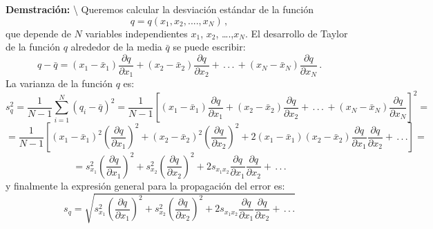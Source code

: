 \documentclass[
]{agujournal2019}
\begin{document}
\noindent \textbf {Demstración:} \textbackslash{} \noindent Queremos
calcular la desviación estándar de la función
\[q=q(x_1, x_2,....,x_N)\,,\] que depende de \(N\) variables
independientes \(x_1\), \(x_2\), \ldots.,\(x_N\). El desarrollo de
Taylor de la función \(q\) alrededor de la media \(\bar{q}\) se puede
escribir:
\[q - \bar{q}=\left(x_1 - \bar{x}_1\right)\frac{\partial{q}}{\partial{x_1}} +
                          \left(x_2 - \bar{x}_2\right)\frac{\partial{q}}{\partial{x_2}}+  \,.\,.\,.\,
                          + \left(x_N - \bar{x}_N\right)\frac{\partial{q}}{\partial{x_N}}\,.\]
La varianza de la función \(q\) es:
\[s^2_q=\frac{1}{N-1}\sum\limits^N_{i=1}\left( q_i-\bar{q} \right)^2=
               \frac{1}{N-1}\left[
               \left(x_1 - \bar{x}_1\right)\frac{\partial{q}}{\partial{x_1}} +
               \left(x_2 - \bar{x}_2\right)\frac{\partial{q}}{\partial{x_2}} +
              \,.\,.\,.\, +
               \left(x_N - \bar{x}_N\right)\frac{\partial{q}}{\partial{x_N}}
               \right]^2=\] \[=\frac{1}{N-1}\left[
\left(x_1 - \bar{x}_1\right)^2\left(\frac{\partial{q}}{\partial{x_1}}\right)^2 +
\left(x_2 - \bar{x}_2\right)^2\left(\frac{\partial{q}}{\partial{x_2}}\right)^2 +
2\left(x_1 - \bar{x}_1\right)\left(x_2 - \bar{x}_2\right)
\frac{\partial{q}}{\partial{x_1}}\frac{\partial{q}}{\partial{x_2}}+\,.\,.\,.
\right]=\]
\[=s^2_{x_1}\left(\frac{\partial{q}}{\partial{x_1}}\right)^2 +
   s^2_{x_2}\left(\frac{\partial{q}}{\partial{x_2}}\right)^2+
   2 s_{{x_1}{x_2}}
   \frac{\partial{q}}{\partial{x_1}}\frac{\partial{q}}{\partial{x_2}}+\,.\,.\,.\]
y finalmente la expresión general para la propagación del error es:
\[s_{q}=\sqrt{s^2_{x_1}\left(\frac{\partial{q}}{\partial{x_1}}\right)^2 +
               s^2_{x_2}\left(\frac{\partial{q}}{\partial{x_2}}\right)^2+
                2 s_{{x_1}{x_2}}
                \frac{\partial{q}}{\partial{x_1}}\frac{\partial{q}}{\partial{x_2}}+\,.\,.\,.}\]

\vspace{0.5cm}
\end{document}
